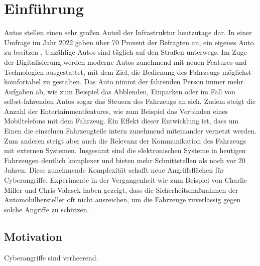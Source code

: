 \chapter{Einführung}

Autos stellen einen sehr großen Anteil der Infrastruktur heutzutage dar. In einer Umfrage im Jahr 2022 gaben über 70 Prozent der Befragten an, ein eigenes Auto zu besitzen \cite[vgl.][]{Statista.2022}. Unzählige Autos sind täglich auf den Straßen unterwegs. Im Zuge der Digitalisierung werden moderne Autos zunehmend mit neuen Features und Technologien ausgestattet, mit dem Ziel, die Bedienung des Fahrzeugs möglichst komfortabel zu gestalten. Das Auto nimmt der fahrenden Person immer mehr Aufgaben ab, wie zum Beispiel das Abblenden, Einparken oder im Fall von selbst-fahrenden Autos sogar das Steuern des Fahrzeugs an sich. Zudem steigt die Anzahl der Entertainmentfeatures, wie zum Beispiel das Verbinden eines Mobiltelefons mit dem Fahrzeug. Ein Effekt dieser Entwicklung ist, dass um Einen die einzelnen Fahrzeugteile intern zunehmend miteinander vernetzt werden. Zum anderen steigt aber auch die Relevanz der Kommunikation des Fahrzeugs mit externen Systemen. Insgesamt sind die elektronischen Systeme in heutigen Fahrzeugen deutlich komplexer und bieten mehr Schnittstellen als noch vor 20 Jahren. Diese zunehmende Komplexität schafft neue Angriffsflächen für Cyberangriffe. Experimente in der Vergangenheit wie zum Beispiel von Charlie Miller und Chris Valasek \cite[vgl.][]{Greenberg.2015} haben gezeigt, dass die Sicherheitsmaßnahmen der Automobilhersteller oft nicht ausreichen, um die Fahrzeuge zuverlässig gegen solche Angriffe zu schützen.

\section{Motivation}
Cyberangriffe sind verheerend.